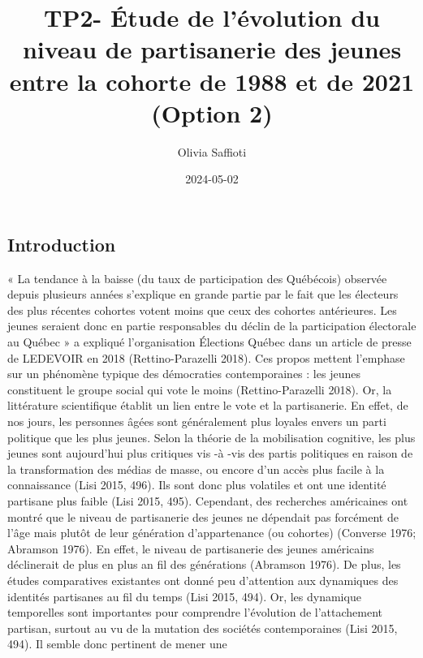 \documentclass[
  letterpaper,
  DIV=11,
  numbers=noendperiod]{scrartcl}
\title{TP2- Étude de l'évolution du niveau de partisanerie des jeunes
entre la cohorte de 1988 et de 2021 (Option 2)}
\author{Olivia Saffioti}
\date{2024-05-02}
\begin{document}
\maketitle
\ifdefined\Shaded\renewenvironment{Shaded}{\begin{tcolorbox}[enhanced, boxrule=0pt, interior hidden, breakable, frame hidden, borderline west={3pt}{0pt}{shadecolor}, sharp corners]}{\end{tcolorbox}}\fi

\hypertarget{introduction}{%
\subsection{Introduction}\label{introduction}}

« La tendance à la baisse (du taux de participation des Québécois)
observée depuis plusieurs années s'explique en grande partie par le fait
que les électeurs des plus récentes cohortes votent moins que ceux des
cohortes antérieures. Les jeunes seraient donc en partie responsables du
déclin de la participation électorale au Québec » a expliqué
l'organisation Élections Québec dans un article de presse de LEDEVOIR en
2018 (Rettino-Parazelli 2018). Ces propos mettent l'emphase sur un
phénomène typique des démocraties contemporaines : les jeunes
constituent le groupe social qui vote le moins (Rettino-Parazelli 2018).
Or, la littérature scientifique établit un lien entre le vote et la
partisanerie. En effet, de nos jours, les personnes âgées sont
généralement plus loyales envers un parti politique que les plus jeunes.
Selon la théorie de la mobilisation cognitive, les plus jeunes sont
aujourd'hui plus critiques vis -à -vis des partis politiques en raison
de la transformation des médias de masse, ou encore d'un accès plus
facile à la connaissance (Lisi 2015, 496). Ils sont donc plus volatiles
et ont une identité partisane plus faible (Lisi 2015, 495). Cependant,
des recherches américaines ont montré que le niveau de partisanerie des
jeunes ne dépendait pas forcément de l'âge mais plutôt de leur
génération d'appartenance (ou cohortes) (Converse 1976; Abramson 1976).
En effet, le niveau de partisanerie des jeunes américains déclinerait de
plus en plus an fil des générations (Abramson 1976). De plus, les études
comparatives existantes ont donné peu d'attention aux dynamiques des
identités partisanes au fil du temps (Lisi 2015, 494). Or, les dynamique
temporelles sont importantes pour comprendre l'évolution de
l'attachement partisan, surtout au vu de la mutation des sociétés
contemporaines (Lisi 2015, 494). Il semble donc pertinent de mener une
\end{document}
